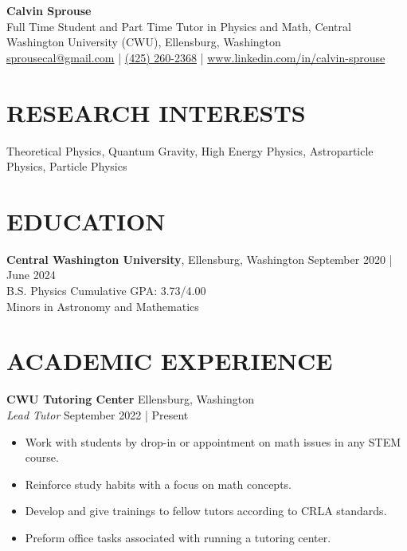 \documentclass[a4paper,9pt]{extarticle}
\begin{document}
\pagestyle{fancy}
\renewcommand{\headrulewidth}{0pt}
\fancyhead{}
\thispagestyle{empty}

\begin{flushleft}
\textbf{\LARGE Calvin Sprouse}\\[2pt]
Full Time Student and Part Time Tutor in Physics and Math, Central Washington University (CWU), Ellensburg, Washington
\\ \href{mailto:sprousecal@gmail.com}{sprousecal@gmail.com} | \href{tel:4252602368}{(425) 260-2368} | \href{https://www.linkedin.com/in/calvin-sprouse}{www.linkedin.com/in/calvin-sprouse}
\end{flushleft}

\section*{RESEARCH INTERESTS}
\noindent
Theoretical Physics, Quantum Gravity, High Energy Physics, Astroparticle Physics, Particle Physics
\section*{EDUCATION}
\noindent
\textbf{Central Washington University}, Ellensburg, Washington \hfill September 2020 | June 2024\\
B.S. Physics \hfill Cumulative GPA: 3.73/4.00 \\
Minors in Astronomy and Mathematics


\section*{ACADEMIC EXPERIENCE}
\noindent
\textbf{CWU Tutoring Center} \hfill Ellensburg, Washington\\
\textit{Lead Tutor} \hfill September 2022 | Present
\begin{itemize}
    \item Work with students by drop-in or appointment on math issues in any STEM course.
    \item Reinforce study habits with a focus on math concepts.
    \item Develop and give trainings to fellow tutors according to CRLA standards.
    \item Preform office tasks associated with running a tutoring center.
\end{itemize}
\end{document}
